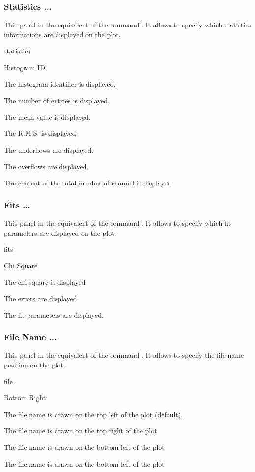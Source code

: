 \subsubsection{Statistics ...}
This panel in the equivalent of the \XPAW{} command . It
allows to specify which statistics informations  are displayed on the plot.

\begin{PAWf}[.2]{statistics}
\begin{DLsf}{Histogram ID}
\item[Histogram ID] The histogram identifier is displayed.
\item[Entries]      The number of entries is displayed.
\item[Mean value]   The mean value is displayed.
\item[R.M.S.]       The R.M.S. is displayed.
\item[Underflows]   The underflows are displayed.
\item[Overflows]    The overflows are displayed.
\item[All channels] The content of the total number of channel is displayed.
\end{DLsf}
\end{PAWf}


\subsubsection{Fits ...}
This panel in the equivalent of the \XPAW{} command . It
allows to specify which fit parameters are displayed on the plot.

\begin{PAWf}[.2]{fits}
\begin{DLsf}{Chi Square}
\item[Chi Square]  The chi square is displayed.
\item[Errors]      The errors are displayed.
\item[Parameters]  The fit parameters are displayed.
\end{DLsf}
\end{PAWf}

\subsubsection{File Name ...}
This panel in the equivalent of the \XPAW{} command . It
allows to specify the file name position on the plot.

\begin{PAWf}[.2]{file}
\begin{DLsf}{Bottom Right}
\item[Top Left]     The file name is drawn on the top left of the plot
                    (default).
\item[Top Right]    The file name is drawn on the top right of the plot
\item[Bottom Left]  The file name is drawn on the bottom left of the plot
\item[Bottom Right] The file name is drawn on the bottom left of the plot
\end{DLsf}
\end{PAWf}

